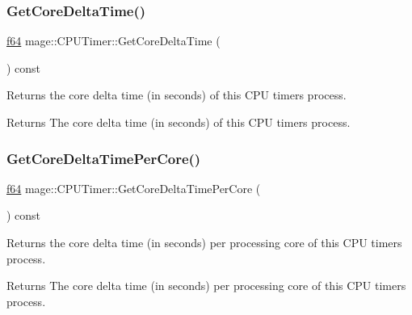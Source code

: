 \subsubsection{\texorpdfstring{Get\+Core\+Delta\+Time()}{GetCoreDeltaTime()}}
{\footnotesize\ttfamily \hyperlink{namespacemage_ab935747c6941320bd6214b5a5f265b09}{f64} mage\+::\+C\+P\+U\+Timer\+::\+Get\+Core\+Delta\+Time (\begin{DoxyParamCaption}{ }\end{DoxyParamCaption}) const\hspace{0.3cm}{\ttfamily [noexcept]}}

Returns the core delta time (in seconds) of this C\+PU timer\textquotesingle{}s process.

\begin{DoxyReturn}{Returns}
The core delta time (in seconds) of this C\+PU timer\textquotesingle{}s process. 
\end{DoxyReturn}
\hypertarget{classmage_1_1_c_p_u_timer_a721f374b8ca33de787c744467d1e3656}{}\label{classmage_1_1_c_p_u_timer_a721f374b8ca33de787c744467d1e3656} 
\subsubsection{\texorpdfstring{Get\+Core\+Delta\+Time\+Per\+Core()}{GetCoreDeltaTimePerCore()}}
{\footnotesize\ttfamily \hyperlink{namespacemage_ab935747c6941320bd6214b5a5f265b09}{f64} mage\+::\+C\+P\+U\+Timer\+::\+Get\+Core\+Delta\+Time\+Per\+Core (\begin{DoxyParamCaption}{ }\end{DoxyParamCaption}) const\hspace{0.3cm}{\ttfamily [noexcept]}}

Returns the core delta time (in seconds) per processing core of this C\+PU timer\textquotesingle{}s process.

\begin{DoxyReturn}{Returns}
The core delta time (in seconds) per processing core of this C\+PU timer\textquotesingle{}s process. 
\end{DoxyReturn}
\hypertarget{classmage_1_1_c_p_u_timer_aaa3e54ebc81f5d99e2f39e12d298e27b}{}\label{classmage_1_1_c_p_u_timer_aaa3e54ebc81f5d99e2f39e12d298e27b} 
